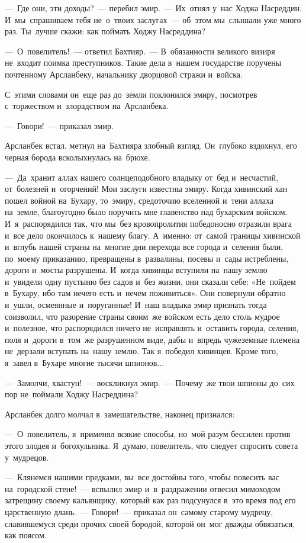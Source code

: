 \documentclass[12pt,a4paper]{book}
\begin{document}
—~Где они, эти доходы?~— перебил эмир.~— Их~отнял у~нас Ходжа Насреддин. И~мы~спрашиваем тебя не~о~твоих заслугах~— об~этом мы~слышали уже много раз. Ты~лучше скажи: как поймать Ходжу Насреддина?

—~О~повелитель!~— ответил Бахтияр.~— В~обязанности великого визиря не~входит поимка преступников. Такие дела в~нашем государстве поручены почтенному Арсланбеку, начальнику дворцовой стражи и~войска.

С~этими словами он~еще раз до~земли поклонился эмиру, посмотрев с~торжеством и~злорадством на~Арсланбека.

—~Говори!~— приказал эмир.

Арсланбек встал, метнул на~Бахтияра злобный взгляд. Он~глубоко вздохнул, его черная борода всколыхнулась на~брюхе.

—~Да~хранит аллах нашего солнцеподобного владыку от~бед и~несчастий, от~болезней и~огорчений! Мои заслуги известны эмиру. Когда хивинский хан пошел войной на~Бухару, то~эмиру, средоточию вселенной и~тени аллаха на~земле, благоугодно было поручить мне главенство над бухарским войском. И~я~распорядился так, что мы~без кровопролития победоносно отразили врага и~все дело окончилось к~нашему благу. А~именно: от~самой границы хивинской и~вглубь нашей страны на~многие дни перехода все города и~селения были, по~моему приказанию, превращены в~развалины, посевы и~сады истреблены, дороги и~мосты разрушены. И~когда хивинцы вступили на~нашу землю и~увидели одну пустыню без садов и~без жизни, они сказали себе: «Не~пойдем в~Бухару, ибо там нечего есть и~нечем поживиться». Они повернули обратно и~ушли, осмеянные и~поруганные! И~наш владыка эмир признать тогда соизволил, что разорение страны своим~же войском есть дело столь мудрое и~полезное, что распорядился ничего не~исправлять и~оставить города, селения, поля и~дороги в~том~же разрушенном виде, дабы и~впредь чужеземные племена не~дерзали вступать на~нашу землю. Так я~победил хивинцев. Кроме того, я~завел в~Бухаре многие тысячи шпионов...

—~Замолчи, хвастун!~— воскликнул эмир.~— Почему~же твои шпионы до~сих пор не~поймали Ходжу Насреддина?

Арсланбек долго молчал в~замешательстве, наконец признался:

—~О~повелитель, я~применял всякие способы, но~мой разум бессилен против этого злодея и~богохульника. Я~думаю, повелитель, что следует спросить совета у~мудрецов.

—~Клянемся нашими предками, вы~все достойны того, чтобы повесить вас на~городской стене!~— вспылил эмир и~в~раздражении отвесил мимоходом затрещину своему кальянщику, который как раз подсунулся в~это время под его царственную длань.~— Говори!~— приказал он~самому старому мудрецу, славившемуся среди прочих своей бородой, которой он~мог дважды обвязаться, как поясом.
\end{document}
